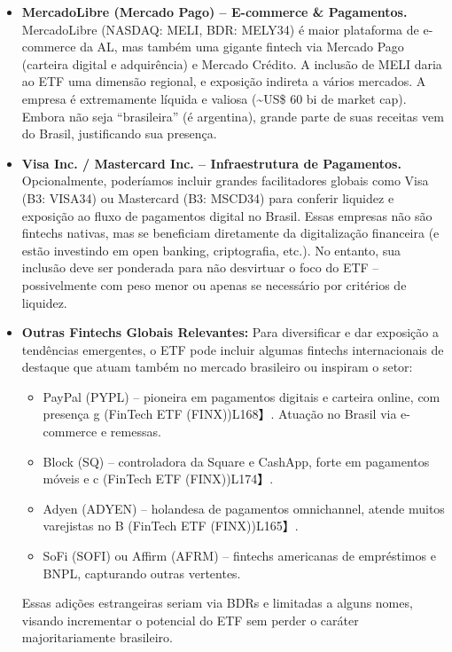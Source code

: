 \documentclass[12pt]{article}
\begin{document}
\begin{itemize}
\item \textbf{MercadoLibre (Mercado Pago) – E-commerce \& Pagamentos.} MercadoLibre (NASDAQ: MELI, BDR: MELY34) é maior plataforma de e-commerce da AL, mas também uma gigante fintech via Mercado Pago (carteira digital e adquirência) e Mercado Crédito. A inclusão de MELI daria ao ETF uma dimensão regional, e exposição indireta a vários mercados. A empresa é extremamente líquida e valiosa (\textasciitilde US\$ 60 bi de market cap). Embora não seja “brasileira” (é argentina), grande parte de suas receitas vem do Brasil, justificando sua presença.

\item \textbf{Visa Inc. / Mastercard Inc. – Infraestrutura de Pagamentos.} Opcionalmente, poderíamos incluir grandes facilitadores globais como Visa (B3: VISA34) ou Mastercard (B3: MSCD34) para conferir liquidez e exposição ao fluxo de pagamentos digital no Brasil. Essas empresas não são fintechs nativas, mas se beneficiam diretamente da digitalização financeira (e estão investindo em open banking, criptografia, etc.). No entanto, sua inclusão deve ser ponderada para não desvirtuar o foco do ETF – possivelmente com peso menor ou apenas se necessário por critérios de liquidez.

\item \textbf{Outras Fintechs Globais Relevantes:} Para diversificar e dar exposição a tendências emergentes, o ETF pode incluir algumas fintechs internacionais de destaque que atuam também no mercado brasileiro ou inspiram o setor:
\begin{itemize}
\item PayPal (PYPL) – pioneira em pagamentos digitais e carteira online, com presença g (FinTech ETF (FINX))L168】. Atuação no Brasil via e-commerce e remessas.
\item Block (SQ) – controladora da Square e CashApp, forte em pagamentos móveis e c (FinTech ETF (FINX))L174】.
\item Adyen (ADYEN) – holandesa de pagamentos omnichannel, atende muitos varejistas no B (FinTech ETF (FINX))L165】.
\item SoFi (SOFI) ou Affirm (AFRM) – fintechs americanas de empréstimos e BNPL, capturando outras vertentes.
\end{itemize}

Essas adições estrangeiras seriam via BDRs e limitadas a alguns nomes, visando incrementar o potencial do ETF sem perder o caráter majoritariamente brasileiro.


\end{itemize}
\end{document}
